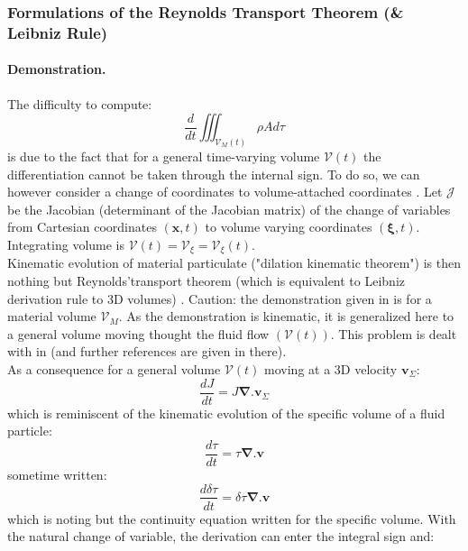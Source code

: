 \subsubsection{Formulations of the Reynolds Transport Theorem (\& Leibniz Rule)}
\paragraph{Demonstration.}
The difficulty to compute:
\begin{equation}
 \displaystyle
 \frac{d}{dt} \iiint_{\mathcal{V}_M(t)} \rho A d\tau
\end{equation}
is due to the fact that for a general time-varying volume $\mathcal{V}(t)$ the differentiation cannot be taken through the internal sign. To do so, we can however consider a change of coordinates to volume-attached coordinates \citep{hirasaki_chapter_2021}. Let $\mathcal{J}$ be the Jacobian (determinant of the Jacobian matrix) of the change of variables from Cartesian coordinates $(\mathbf{x},t)$ to volume varying coordinates $(\boldsymbol{\xi},t)$. Integrating volume is $\mathcal{V}(t)=\mathcal{V}_{\xi}=\mathcal{V}_{\xi}(t)$.\\
Kinematic evolution of material particulate ("dilation kinematic theorem") is then nothing but Reynolds'transport theorem (which is equivalent to Leibniz derivation rule to 3D volumes) \citep{hirasaki_chapter_2021}. Caution: the demonstration given in \citep{hirasaki_chapter_2021} is for a material volume $\mathcal{V}_M$. As the demonstration is kinematic, it is generalized here to a general volume moving thought the fluid flow $(\mathcal{V}(t))$. This problem is dealt with in \cite{web_course_web_2021} (and further references are given in there).\\
As a consequence for a general volume $\mathcal{V}(t)$ moving at a 3D velocity $  \mathbf{v}_{\Sigma}$:
\begin{equation}
 \displaystyle
 \frac{dJ}{dt}=J \mathbf{\nabla}.\mathbf{v}_{\Sigma}
\end{equation}
which is reminiscent of the kinematic evolution of the specific volume of a fluid particle:
\begin{equation}
 \displaystyle
 \frac{d\tau}{dt}=\tau \mathbf{\nabla}.\mathbf{v}
\end{equation}
sometime written:
\begin{equation}
 \displaystyle
 \frac{d\delta\tau}{dt}=\delta\tau \mathbf{\nabla}.\mathbf{v}
\end{equation}
which is noting but the continuity equation written for the specific volume. With the natural change of variable, the derivation can enter the integral sign and:

